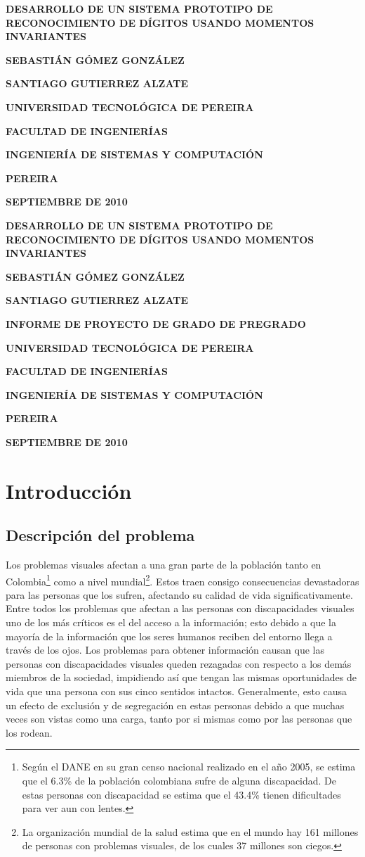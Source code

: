 \documentclass[a4paper, 11pt, oneside]{report}
\newcommand\portada{
	\begin{titlepage}
		\begin{center}
			{\large \bf DESARROLLO DE UN SISTEMA PROTOTIPO DE RECONOCIMIENTO DE DÍGITOS USANDO MOMENTOS INVARIANTES }
			\vfill
			{\large\bf SEBASTIÁN GÓMEZ GONZÁLEZ \par}
			{\large\bf SANTIAGO GUTIERREZ ALZATE \par}
			\vfill
			{\large\bf UNIVERSIDAD TECNOLÓGICA DE PEREIRA  \par}
			{\large\bf FACULTAD DE INGENIERÍAS \par}
			{\large\bf INGENIERÍA DE SISTEMAS Y COMPUTACIÓN \par}
			{\large\bf PEREIRA\par}
			{\large\bf SEPTIEMBRE DE 2010 \par}
		\end{center}
	\end{titlepage}
}
\newcommand\contraportada{
	\begin{titlepage}
		\begin{center}
			{\large \bf DESARROLLO DE UN SISTEMA PROTOTIPO DE RECONOCIMIENTO DE DÍGITOS USANDO MOMENTOS INVARIANTES }
			\vfill
			{\large\bf SEBASTIÁN GÓMEZ GONZÁLEZ \par}
			{\large\bf SANTIAGO GUTIERREZ ALZATE \par}
			\vfill
			{\large\bf INFORME DE PROYECTO DE GRADO DE PREGRADO\par}
			\vfill
			{\large\bf UNIVERSIDAD TECNOLÓGICA DE PEREIRA  \par}
			{\large\bf FACULTAD DE INGENIERÍAS \par}
			{\large\bf INGENIERÍA DE SISTEMAS Y COMPUTACIÓN \par}
			{\large\bf PEREIRA\par}
			{\large\bf SEPTIEMBRE DE 2010 \par}
		\end{center}
	\end{titlepage}
}
\begin{document}
\portada

\contraportada

\tableofcontents

\listoffigures

\listoftables

\chapter{Introducción}
\label{chap:intro}

\section{Descripción del problema}

Los problemas visuales afectan a una gran parte de la población tanto en Colombia\footnote{Según el DANE en su gran censo nacional realizado en el año 2005, se estima que el 6.3\% de la población colombiana sufre de alguna discapacidad. De estas personas con discapacidad se estima que el 43.4\% tienen dificultades para ver aun con lentes.} como a nivel mundial\footnote{La organización mundial de la salud estima que en el mundo hay 161 millones de personas con problemas visuales, de los cuales 37 millones son ciegos.}. Estos traen consigo consecuencias devastadoras para las personas que los sufren, afectando su calidad de vida significativamente. Entre todos los problemas que afectan a las personas con discapacidades visuales uno de los más críticos es el del acceso a la información; esto debido a que la mayoría de la información que los seres humanos reciben del entorno llega a través de los ojos. Los problemas para obtener información causan que las personas con discapacidades visuales queden rezagadas con respecto a los demás miembros de la sociedad, impidiendo así que tengan las mismas oportunidades de vida que una persona con sus cinco sentidos intactos. Generalmente, esto causa un efecto de exclusión y de segregación en estas personas debido a que muchas veces son vistas como una carga, tanto por si mismas como por las personas que los rodean. 
\end{document}
